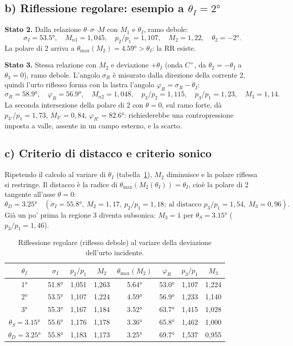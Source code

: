 \documentclass[11pt,a4paper]{article}
\newcommand{\Cp}{C^{+}}
\begin{document}
\subsection*{b) Riflessione regolare: esempio a $\theta_I=\ang{2}$}
\textbf{Stato 2.} Dalla relazione $\theta$--$\sigma$--$M$ con $M_1$ e $\theta_I$, ramo debole:
\[
\sigma_I=\ang{53.5},\quad M_{n1}=1{,}045,\quad p_2/p_1=1{,}107,\quad M_2=1{,}22,\quad \theta_2=-\ang{2}.
\]
La polare di 2 arriva a $\theta_{\max}(M_2)=\ang{4.59}>\theta_I$: la RR esiste.

\textbf{Stato 3.} Stessa relazione con $M_2$ e deviazione $+\theta_I$ (onda $\Cp$, da $\theta_2=-\theta_I$ a
$\theta_3=0$), ramo debole. L'angolo $\sigma_R$ è misurato dalla direzione della corrente 2, quindi l'urto
riflesso forma con la lastra l'angolo $\varphi_R=\sigma_R-\theta_I$:
\[
\sigma_R=\ang{58.9},\quad \varphi_R=\ang{56.9},\quad M_{n2}=1{,}048,\quad p_3/p_2=1{,}115,\quad p_3/p_1=1{,}23,
\quad M_3=1{,}14 .
\]
La seconda intersezione della polare di 2 con $\theta=0$, sul ramo forte, dà $p_{3'}/p_1=1{,}73$, $M_{3'}=0{,}84$,
$\varphi_{R'}=\ang{82.6}$: richiederebbe una contropressione imposta a valle, assente in un campo esterno, e la
scarto.

\subsection*{c) Criterio di distacco e criterio sonico}
Ripetendo il calcolo al variare di $\theta_I$ (tabella~\ref{tab:rr}), $M_2$ diminuisce e la polare riflessa si
restringe. Il distacco è la radice di $\theta_{\max}(M_2(\theta_I))=\theta_I$, cioè la polare di 2 tangente all'asse
$\theta=0$:
\[
\theta_D=\ang{3.25}\quad(\sigma_I=\ang{55.8},\ M_2=1{,}17,\ p_2/p_1=1{,}18;\ \text{al distacco }p_3/p_1=1{,}54,\
M_3=0{,}96).
\]
Già un po' prima la regione 3 diventa subsonica: $M_3=1$ per $\theta_S=\ang{3.15}$ ($p_3/p_1=1{,}46$).

\begin{table}[H]
  \centering
  \begin{tabular}{cccccccc}
    \toprule
    $\theta_I$ & $\sigma_I$ & $p_2/p_1$ & $M_2$ & $\theta_{\max}(M_2)$ & $\varphi_R$ & $p_3/p_1$ & $M_3$ \\
    \midrule
    \ang{1}    & \ang{51.8} & 1,051 & 1,263 & \ang{5.64} & \ang{53.0} & 1,107 & 1,224 \\
    \ang{2}    & \ang{53.5} & 1,107 & 1,224 & \ang{4.59} & \ang{56.9} & 1,233 & 1,140 \\
    \ang{3}    & \ang{55.3} & 1,167 & 1,184 & \ang{3.52} & \ang{63.7} & 1,415 & 1,028 \\
    $\theta_S=\ang{3.15}$ & \ang{55.6} & 1,176 & 1,178 & \ang{3.36} & \ang{65.8} & 1,462 & 1,000 \\
    $\theta_D=\ang{3.25}$ & \ang{55.8} & 1,183 & 1,173 & \ang{3.25} & \ang{69.7} & 1,537 & 0,955 \\
    \bottomrule
  \end{tabular}
  \caption{Riflessione regolare (riflesso debole) al variare della deviazione dell'urto incidente.}
  \label{tab:rr}
\end{table}
\end{document}
